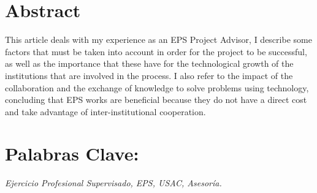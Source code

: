 \documentclass[11pt,spanish,Letterpaper,openany]{book}
\begin{document}
\hypertarget{abstract}{%
\section*{Abstract}\label{abstract}}

This article deals with my experience as an EPS Project Advisor, I describe some factors that must be taken into account in order for the project to be successful, as well as the importance that these have for the technological growth of the institutions that are involved in the process. I also refer to the impact of the collaboration and the exchange of knowledge to solve problems using technology, concluding that EPS works are beneficial because they do not have a direct cost and take advantage of inter-institutional cooperation.

\hypertarget{palabras-clave}{%
\section*{Palabras Clave:}\label{palabras-clave}}

\emph{Ejercicio Profesional Supervisado, EPS, USAC, Asesoría.}
\end{document}
